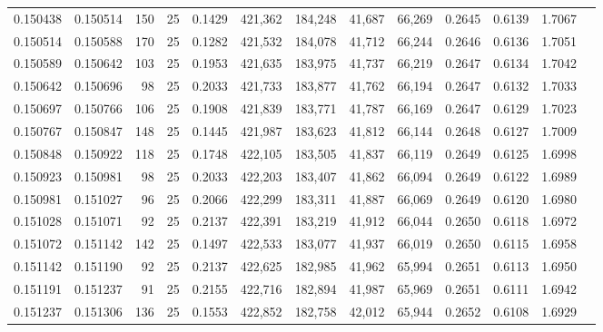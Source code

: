 \begin{tabular}{rrrrrrrrrrrrr}
0.150438 & 0.150514 &   150 &  25 &                                     0.1429 & 421,362 & 184,248 &  41,687 &  66,269 & 0.2645 & 0.6139 & 1.7067 \\
0.150514 & 0.150588 &   170 &  25 &                                     0.1282 & 421,532 & 184,078 &  41,712 &  66,244 & 0.2646 & 0.6136 & 1.7051 \\
0.150589 & 0.150642 &   103 &  25 &                                     0.1953 & 421,635 & 183,975 &  41,737 &  66,219 & 0.2647 & 0.6134 & 1.7042 \\
0.150642 & 0.150696 &    98 &  25 &                                     0.2033 & 421,733 & 183,877 &  41,762 &  66,194 & 0.2647 & 0.6132 & 1.7033 \\
0.150697 & 0.150766 &   106 &  25 &                                     0.1908 & 421,839 & 183,771 &  41,787 &  66,169 & 0.2647 & 0.6129 & 1.7023 \\
0.150767 & 0.150847 &   148 &  25 &                                     0.1445 & 421,987 & 183,623 &  41,812 &  66,144 & 0.2648 & 0.6127 & 1.7009 \\
0.150848 & 0.150922 &   118 &  25 &                                     0.1748 & 422,105 & 183,505 &  41,837 &  66,119 & 0.2649 & 0.6125 & 1.6998 \\
0.150923 & 0.150981 &    98 &  25 &                                     0.2033 & 422,203 & 183,407 &  41,862 &  66,094 & 0.2649 & 0.6122 & 1.6989 \\
0.150981 & 0.151027 &    96 &  25 &                                     0.2066 & 422,299 & 183,311 &  41,887 &  66,069 & 0.2649 & 0.6120 & 1.6980 \\
0.151028 & 0.151071 &    92 &  25 &                                     0.2137 & 422,391 & 183,219 &  41,912 &  66,044 & 0.2650 & 0.6118 & 1.6972 \\
0.151072 & 0.151142 &   142 &  25 &                                     0.1497 & 422,533 & 183,077 &  41,937 &  66,019 & 0.2650 & 0.6115 & 1.6958 \\
0.151142 & 0.151190 &    92 &  25 &                                     0.2137 & 422,625 & 182,985 &  41,962 &  65,994 & 0.2651 & 0.6113 & 1.6950 \\
0.151191 & 0.151237 &    91 &  25 &                                     0.2155 & 422,716 & 182,894 &  41,987 &  65,969 & 0.2651 & 0.6111 & 1.6942 \\
0.151237 & 0.151306 &   136 &  25 &                                     0.1553 & 422,852 & 182,758 &  42,012 &  65,944 & 0.2652 & 0.6108 & 1.6929 \\

\end{tabular}
